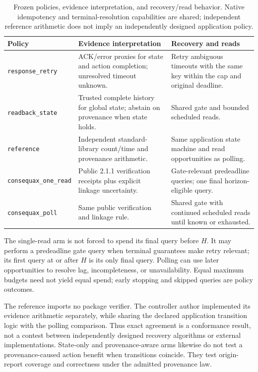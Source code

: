 \documentclass[conference]{IEEEtran}
\begin{document}
\begin{table}[t]
\caption{Frozen policies, evidence interpretation, and recovery/read behavior. Native idempotency and terminal-resolution capabilities are shared; independent reference arithmetic does not imply an independently designed application policy.}
\label{tab:policies}
\centering\small
\setlength{\tabcolsep}{5pt}
\renewcommand{\arraystretch}{1.12}
\begin{tabular}{>{\raggedright\arraybackslash}p{}>{\raggedright\arraybackslash}p{}>{\raggedright\arraybackslash}p{}}
\toprule
Policy & Evidence interpretation & Recovery and reads \\
\midrule
\texttt{response\_retry} & ACK/error proxies for state and action completion; unresolved timeout unknown. & Retry ambiguous timeouts with the same key within the cap and original deadline. \\
\texttt{readback\_state} & Trusted complete history for global state; abstain on provenance when state holds. & Shared gate and bounded scheduled reads. \\
\texttt{reference} & Independent standard-library count/time and provenance arithmetic. & Same application state machine and read opportunities as polling. \\
\texttt{consequax\_one\_read} & Public 2.1.1 verification receipts plus explicit linkage uncertainty. & Gate-relevant predeadline queries; one final horizon-eligible query. \\
\texttt{consequax\_poll} & Same public verification and linkage rule. & Shared gate with continued scheduled reads until known or exhausted. \\
\bottomrule
\end{tabular}
\end{table}

The single-read arm is not forced to spend its final query before $H$. It may perform a predeadline gate query when terminal guarantees make retry relevant; its first query at or after $H$ is its only final query. Polling can use later opportunities to resolve lag, incompleteness, or unavailability. Equal maximum budgets need not yield equal spend; early stopping and skipped queries are policy outcomes.

The reference imports no package verifier. The controller author implemented its evidence arithmetic separately, while sharing the declared application transition logic with the polling comparison. Thus exact agreement is a conformance result, not a contest between independently designed recovery algorithms or external implementations. State-only and provenance-aware arms likewise do not test a provenance-caused action benefit when transitions coincide. They test origin-report coverage and correctness under the admitted provenance law.
\end{document}
